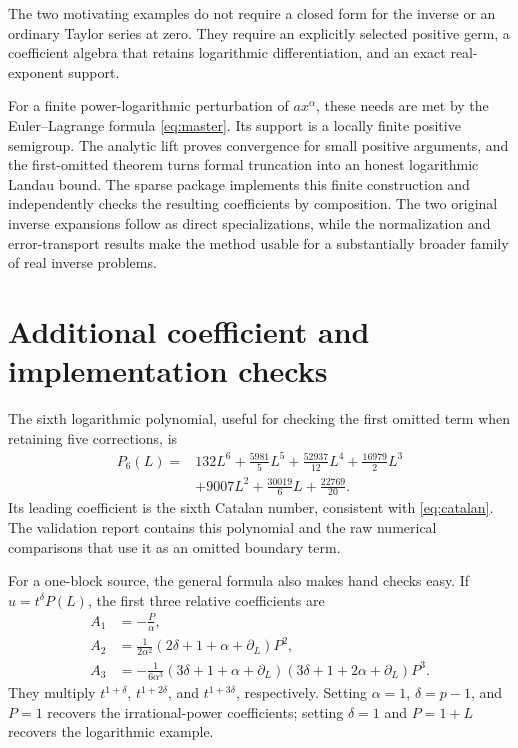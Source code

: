 \documentclass[11pt,a4paper]{article}
\numberwithin{equation}{section}
\theoremstyle{definition}\newtheorem{definition}[theorem]{Definition}
\theoremstyle{remark}\newtheorem{remark}[theorem]{Remark}
\begin{document}
The two motivating examples do not require a closed form for the inverse or
an ordinary Taylor series at zero. They require an explicitly selected
positive germ, a coefficient algebra that retains logarithmic differentiation,
and an exact real-exponent support.

For a finite power-logarithmic perturbation of \(a x^\alpha\), these needs
are met by the Euler--Lagrange formula \eqref{eq:master}. Its support is a
locally finite positive semigroup. The analytic lift proves convergence for
small positive arguments, and the first-omitted theorem turns formal
truncation into an honest logarithmic Landau bound. The sparse package
implements this finite construction and independently checks the resulting
coefficients by composition. The two original inverse expansions follow
as direct specializations, while the normalization and error-transport
results make the method usable for a substantially broader family of
real inverse problems.

\appendix
\section{Additional coefficient and implementation checks}

The sixth logarithmic polynomial, useful for checking the first omitted
term when retaining five corrections, is
\begin{align*}
 P_6(L)={}&132L^6+\frac{5981}{5}L^5+\frac{52937}{12}L^4
 +\frac{16979}{2}L^3\\
 &+9007L^2+\frac{30019}{6}L+\frac{22769}{20}.
\end{align*}
Its leading coefficient is the sixth Catalan number, consistent with
\eqref{eq:catalan}. The validation report contains this polynomial and the
raw numerical comparisons that use it as an omitted boundary term.

For a one-block source, the general formula also makes hand checks easy.
If \(u=t^\delta P(L)\), the first three relative coefficients are
\begin{align*}
 A_1&=-\frac{P}{\alpha},\\
 A_2&=\frac{1}{2\alpha^2}
       (2\delta+1+\alpha+\partial_L)P^2,\\
 A_3&=-\frac{1}{6\alpha^3}
       (3\delta+1+\alpha+\partial_L)
       (3\delta+1+2\alpha+\partial_L)P^3.
\end{align*}
They multiply \(t^{1+\delta}\), \(t^{1+2\delta}\), and
\(t^{1+3\delta}\), respectively. Setting \(\alpha=1\),
\(\delta=p-1\), and \(P=1\) recovers the irrational-power coefficients;
setting \(\delta=1\) and \(P=1+L\) recovers the logarithmic example.
\end{document}
